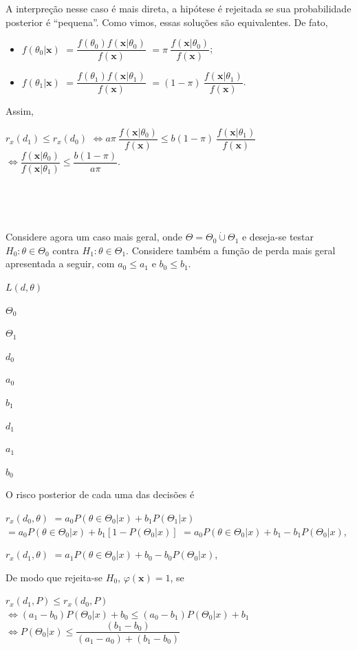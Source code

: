 \documentclass[
]{book}
\begin{document}
A interpreção nesse caso é mais direta, a hipótese é rejeitada se sua probabilidade posterior é ``pequena''. Como vimos, essas soluções são equivalentes. De fato,

\begin{itemize}
\item
  \(f(\theta_0|\boldsymbol x)\) \(=\dfrac{f(\theta_0)f(\boldsymbol x|\theta_0)}{f(\boldsymbol x)}\) \(=\pi~\dfrac{f(\boldsymbol x|\theta_0)}{f(\boldsymbol x)}\);
\item
  \(f(\theta_1|\boldsymbol x)\) \(=\dfrac{f(\theta_1)f(\boldsymbol x|\theta_1)}{f(\boldsymbol x)}\) \(=(1-\pi)~\dfrac{f(\boldsymbol x|\theta_1)}{f(\boldsymbol x)}\).
\end{itemize}

Assim,

\(r_x(d_1) \leq r_x(d_0)\)
\(\Longleftrightarrow a \pi~\dfrac{f(\boldsymbol x|\theta_0)}{f(\boldsymbol x)} \leq b (1-\pi)~\dfrac{f(\boldsymbol x|\theta_1)}{f(\boldsymbol x)}\)
\(\Longleftrightarrow \dfrac{f(\boldsymbol x|\theta_0)}{f(\boldsymbol x|\theta_1)} \leq \dfrac{b (1-\pi)}{a \pi}\).

\(~\)

\(~\)

Considere agora um caso mais geral, onde \(\Theta=\Theta_0 \dot{\cup} \Theta_1\) e deseja-se testar \(H_0: \theta \in \Theta_0\) contra \(H_1: \theta \in \Theta_1\). Considere também a função de perda mais geral apresentada a seguir, com \(a_0 \leq a_1\) e \(b_0 \leq b_1\).

\(L(d,\theta)\)

\(\Theta_0\)

\(\Theta_1\)

\(d_0\)

\(a_0\)

\(b_1\)

\(d_1\)

\(a_1\)

\(b_0\)

O risco posterior de cada uma das decisões é

\(r_x(d_0,\theta)\) \(=a_0P(\theta\in\Theta_0|x)+b_1P(\Theta_1|x)\) \(=a_0P(\theta\in\Theta_0|x)+b_1\left[1- P(\Theta_0|x)\right]\) \(=a_0P(\theta\in\Theta_0|x)+b_1-b_1P(\Theta_0|x)\),

\(r_x(d_1,\theta)\) \(=a_1P(\theta\in\Theta_0|x)+b_0-b_0P(\Theta_0|x)\),

De modo que rejeita-se \(H_0\), \(\varphi(\boldsymbol x)=1\), se

\(r_x(d_1,P)\leq r_x(d_0,P)\) \(\Leftrightarrow (a_1-b_0)P(\Theta_0|x)+b_0 \leq (a_0-b_1)P(\Theta_0|x)+b_1\) \(\Leftrightarrow P(\Theta_0|x) \leq \dfrac{(b_1-b_0)}{(a_1-a_0)+(b_1-b_0)}\)
\end{document}
